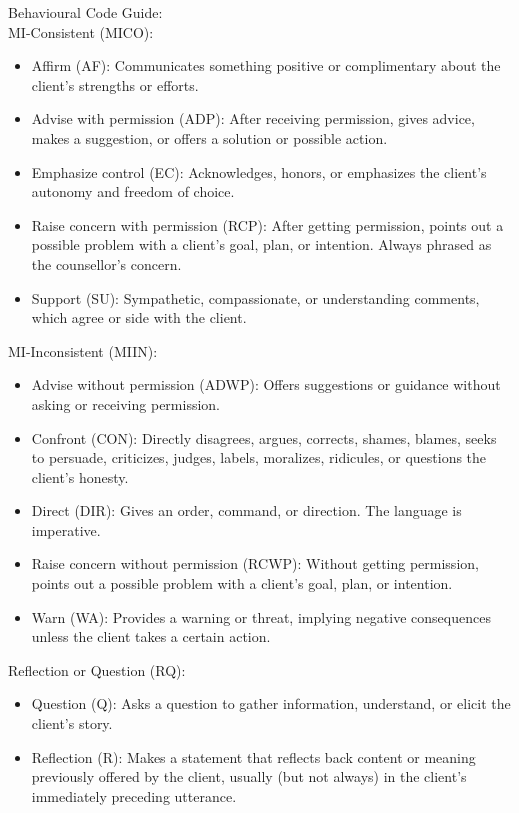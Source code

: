 \begin{tcolorbox}
Behavioural Code Guide:\\

MI-Consistent (MICO):
\begin{itemize}[itemsep=0pt, parsep=0pt]
    \item Affirm (AF): Communicates something positive or complimentary about the client's strengths or efforts.
    \item Advise with permission (ADP): After receiving permission, gives advice, makes a suggestion, or offers a solution or possible action.
    \item Emphasize control (EC): Acknowledges, honors, or emphasizes the client's autonomy and freedom of choice.
    \item Raise concern with permission (RCP): After getting permission, points out a possible problem with a client's goal, plan, or intention. Always phrased as the counsellor's concern.
    \item Support (SU): Sympathetic, compassionate, or understanding comments, which agree or side with the client.
\end{itemize}

MI-Inconsistent (MIIN):
\begin{itemize}[itemsep=0pt, parsep=0pt]
    \item Advise without permission (ADWP): Offers suggestions or guidance without asking or receiving permission.
    \item Confront (CON): Directly disagrees, argues, corrects, shames, blames, seeks to persuade, criticizes, judges, labels, moralizes, ridicules, or questions the client's honesty.
    \item Direct (DIR): Gives an order, command, or direction. The language is imperative.
    \item Raise concern without permission (RCWP): Without getting permission, points out a possible problem with a client's goal, plan, or intention.
    \item Warn (WA): Provides a warning or threat, implying negative consequences unless the client takes a certain action.
\end{itemize}

Reflection or Question (RQ):
\begin{itemize}[itemsep=0pt, parsep=0pt]
    \item Question (Q): Asks a question to gather information, understand, or elicit the client's story.
    \item Reflection (R): Makes a statement that reflects back content or meaning previously offered by the client, usually (but not always) in the client's immediately preceding utterance.
\end{itemize}


\end{tcolorbox}
